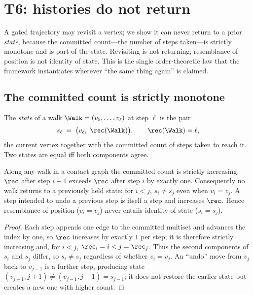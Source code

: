 
\section{T6: histories do not return}
\label{sec:monotone}

A gated trajectory may revisit a vertex; we show it can never return to a prior
\emph{state}, because the committed count---the number of steps taken---is
strictly monotone and is part of the state. Revisiting is not returning;
resemblance of position is not identity of state. This is the single
order-theoretic law that the framework instantiates wherever ``the same thing
again'' is claimed.

\subsection{The committed count is strictly monotone}

\begin{definition}
\label{def:state}
The \emph{state} of a walk $\Walk=(v_0,\dots,v_\ell)$ at step $\ell$ is the pair
\[
s_\ell\;=\;\bigl(v_\ell,\ \rec(\Walk)\bigr),\qquad \rec(\Walk)=\ell,
\]
the current vertex together with the committed count of steps taken to reach it.
Two states are equal iff both components agree.
\end{definition}

\begin{theorem}
\label{thm:nonreturn}
Along any walk in a contact graph the committed count is strictly increasing:
$\rec$ after step $i+1$ exceeds $\rec$ after step $i$ by exactly one. Consequently
no walk returns to a previously held state: for $i<j$, $s_i\neq s_j$ even when
$v_i=v_j$. A step intended to undo a previous step is itself a step and increases
$\rec$. Hence resemblance of position \textup{(}$v_i=v_j$\textup{)} never entails
identity of state \textup{(}$s_i=s_j$\textup{)}.
\end{theorem}

\begin{proof}
Each step appends one edge to the committed multiset and advances the index by
one, so $\rec$ increases by exactly $1$ per step; it is therefore strictly
increasing and, for $i<j$, $\rec_i=i<j=\rec_j$. Thus the second components of
$s_i$ and $s_j$ differ, so $s_i\neq s_j$ regardless of whether $v_i=v_j$. An
``undo'' move from $v_j$ back to $v_{j-1}$ is a further step, producing state
$(v_{j-1},j{+}1)\neq(v_{j-1},j{-}1)=s_{j-1}$; it does not restore the earlier
state but creates a new one with higher count.
\end{proof}

